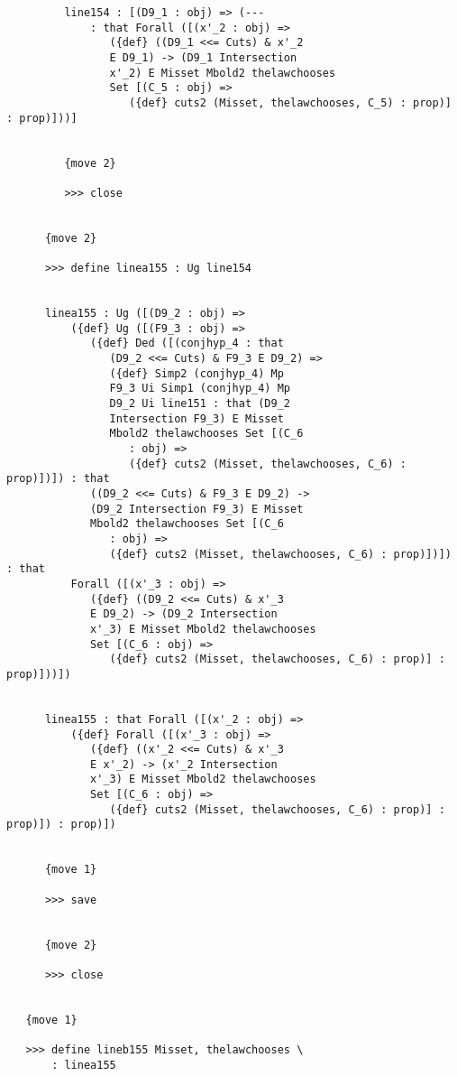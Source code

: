 \documentclass[12pt]{article}
\begin{document}
\begin{verbatim}
         line154 : [(D9_1 : obj) => (--- 
             : that Forall ([(x'_2 : obj) => 
                ({def} ((D9_1 <<= Cuts) & x'_2 
                E D9_1) -> (D9_1 Intersection 
                x'_2) E Misset Mbold2 thelawchooses 
                Set [(C_5 : obj) => 
                   ({def} cuts2 (Misset, thelawchooses, C_5) : prop)] : prop)]))]


         {move 2}

         >>> close


      {move 2}

      >>> define linea155 : Ug line154


      linea155 : Ug ([(D9_2 : obj) => 
          ({def} Ug ([(F9_3 : obj) => 
             ({def} Ded ([(conjhyp_4 : that 
                (D9_2 <<= Cuts) & F9_3 E D9_2) => 
                ({def} Simp2 (conjhyp_4) Mp 
                F9_3 Ui Simp1 (conjhyp_4) Mp 
                D9_2 Ui line151 : that (D9_2 
                Intersection F9_3) E Misset 
                Mbold2 thelawchooses Set [(C_6 
                   : obj) => 
                   ({def} cuts2 (Misset, thelawchooses, C_6) : prop)])]) : that 
             ((D9_2 <<= Cuts) & F9_3 E D9_2) -> 
             (D9_2 Intersection F9_3) E Misset 
             Mbold2 thelawchooses Set [(C_6 
                : obj) => 
                ({def} cuts2 (Misset, thelawchooses, C_6) : prop)])]) : that 
          Forall ([(x'_3 : obj) => 
             ({def} ((D9_2 <<= Cuts) & x'_3 
             E D9_2) -> (D9_2 Intersection 
             x'_3) E Misset Mbold2 thelawchooses 
             Set [(C_6 : obj) => 
                ({def} cuts2 (Misset, thelawchooses, C_6) : prop)] : prop)]))])


      linea155 : that Forall ([(x'_2 : obj) => 
          ({def} Forall ([(x'_3 : obj) => 
             ({def} ((x'_2 <<= Cuts) & x'_3 
             E x'_2) -> (x'_2 Intersection 
             x'_3) E Misset Mbold2 thelawchooses 
             Set [(C_6 : obj) => 
                ({def} cuts2 (Misset, thelawchooses, C_6) : prop)] : prop)]) : prop)])


      {move 1}

      >>> save


      {move 2}

      >>> close


   {move 1}

   >>> define lineb155 Misset, thelawchooses \
       : linea155



\end{verbatim}
\end{document}

